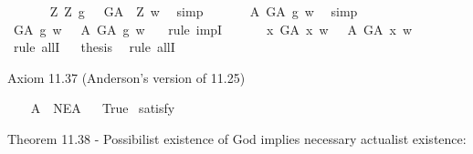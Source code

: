 \begin{isabellebody}
\ \ \ \ \ \isamarkupfalse%
\ {\isachardoublequoteopen}{\isacharparenleft}\isactrlbold {\isasymforall}Z{\isachardot}\ \isactrlbold {\isasymbox}{\isacharparenleft}Z\ g{\isacharparenright}\ \isactrlbold {\isasymleftrightarrow}\ \ G\isactrlsup A\ {\isasymRrightarrow}\ Z{\isacharparenright}\ w{\isachardoublequoteclose}\ \isamarkupfalse%
\ simp\isanewline
\ \ \ \ \ \isamarkupfalse%
\ {\isachardoublequoteopen}{\isasymE}\isactrlsup A\ G\isactrlsup A\ g\ w{\isachardoublequoteclose}\ \isamarkupfalse%
\ simp\isanewline
\ \ \ \ \isacommand{{\isacharbraceright}}\isamarkupfalse%
\isanewline
\ \ \ \ \isamarkupfalse%
\ {\isachardoublequoteopen}G\isactrlsup A\ g\ w\ \ {\isasymlongrightarrow}\ {\isasymE}\isactrlsup A\ G\isactrlsup A\ g\ w\ {\isachardoublequoteclose}\ \isamarkupfalse%
\ {\isacharparenleft}rule\ impI{\isacharparenright}\isanewline
\ \ \isacommand{{\isacharbraceright}}\isamarkupfalse%
\isanewline
\ \ \isamarkupfalse%
\ {\isachardoublequoteopen}{\isasymforall}x{\isachardot}\ G\isactrlsup A\ x\ w\ \ {\isasymlongrightarrow}\ {\isasymE}\isactrlsup A\ G\isactrlsup A\ x\ w\ {\isachardoublequoteclose}\ \ \isamarkupfalse%
\ {\isacharparenleft}rule\ allI{\isacharparenright}\isanewline
\isacommand{{\isacharbraceright}}\isamarkupfalse%
\isanewline
\ \isamarkupfalse%
\ {\isacharquery}thesis\ \isamarkupfalse%
\ {\isacharparenleft}rule\ allI{\isacharparenright}\ \isanewline
{}\isamarkupfalse%
%
\endisatagproof
{\isafoldproof}%
%
\isadelimproof
%
\endisadelimproof
%
\begin{isamarkuptext}%
Axiom 11.37 (Anderson's version of 11.25)%
\end{isamarkuptext}\isamarkuptrue%
\isamarkupfalse%
\ \ \isanewline
\ A{}{\isacharcolon}\ {\isachardoublequoteopen}{\isasymlfloor}{\isasymP}\ NE\isactrlsup A{\isasymrfloor}{\isachardoublequoteclose}\isanewline
\ \isanewline
{}\isamarkupfalse%
\ True\ \isamarkupfalse%
{\isacharbrackleft}satisfy{\isacharbrackright}%
\isadelimproof
\ %
\endisadelimproof
%
\isatagproof
{}\isamarkupfalse%
\ %
%
\endisatagproof
{\isafoldproof}%
%
\isadelimproof
%
\endisadelimproof
%
\begin{isamarkuptext}%
Theorem 11.38 - Possibilist existence of God implies necessary actualist existence:%
\end{isamarkuptext}\isamarkuptrue%

\end{isabellebody}
